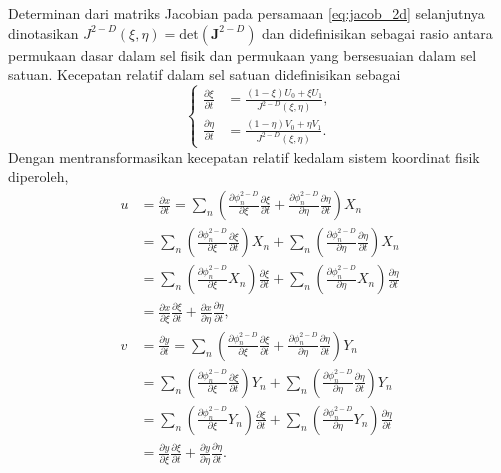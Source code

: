 \begin{spacing}{1.5}
	Determinan dari matriks Jacobian pada persamaan \ref{eq:jacob_2d} selanjutnya dinotasikan $J^{2-D}(\xi,\eta)=\text{det}(\textbf{J}^{2-D})$ dan didefinisikan sebagai rasio antara permukaan dasar dalam sel fisik dan permukaan yang bersesuaian dalam sel satuan. Kecepatan relatif dalam sel satuan didefinisikan sebagai
	\begin{equation}
		\begin{cases}
			\frac{\partial \xi}{\partial t} &= \frac{(1-\xi)U_0+\xi U_1}{J^{2-D}(\xi,\eta)}, \\
			\frac{\partial \eta}{\partial t} &= \frac{(1-\eta)V_0+\eta V_1}{J^{2-D}(\xi,\eta)}.
		\end{cases}	
	\end{equation}
	Dengan mentransformasikan kecepatan relatif kedalam sistem koordinat fisik diperoleh,
	\begin{equation*}
		\begin{aligned}
			u &= \frac{\partial x}{\partial t} = \sum_n \left(\frac{\partial \phi_n^{2-D}}{\partial \xi}\frac{\partial \xi}{\partial t}+\frac{\partial \phi_n^{2-D}}{\partial \eta}\frac{\partial \eta}{\partial t}\right)X_n \\
			&= \sum_n \left(\frac{\partial \phi_n^{2-D}}{\partial \xi}\frac{\partial \xi}{\partial t}\right)X_n + \sum_n \left(\frac{\partial \phi_n^{2-D}}{\partial \eta}\frac{\partial \eta}{\partial t}\right)X_n \\
			&= \sum_n \left(\frac{\partial \phi_n^{2-D}}{\partial \xi}X_n\right)\frac{\partial \xi}{\partial t} + \sum_n \left(\frac{\partial \phi_n^{2-D}}{\partial \eta}X_n\right)\frac{\partial \eta}{\partial t} \\
			&= \frac{\partial x}{\partial \xi}\frac{\partial \xi}{\partial t}+\frac{\partial x}{\partial \eta}\frac{\partial \eta}{\partial t}, \\
			v &= \frac{\partial y}{\partial t} = \sum_n \left(\frac{\partial \phi_n^{2-D}}{\partial \xi}\frac{\partial \xi}{\partial t}+\frac{\partial \phi_n^{2-D}}{\partial \eta}\frac{\partial \eta}{\partial t}\right)Y_n \\
			&= \sum_n \left(\frac{\partial \phi_n^{2-D}}{\partial \xi}\frac{\partial \xi}{\partial t}\right)Y_n + \sum_n \left(\frac{\partial \phi_n^{2-D}}{\partial \eta}\frac{\partial \eta}{\partial t}\right)Y_n \\
			&= \sum_n \left(\frac{\partial \phi_n^{2-D}}{\partial \xi}Y_n\right)\frac{\partial \xi}{\partial t} + \sum_n \left(\frac{\partial \phi_n^{2-D}}{\partial \eta}Y_n\right)\frac{\partial \eta}{\partial t} \\
			&= \frac{\partial y}{\partial \xi}\frac{\partial \xi}{\partial t}+\frac{\partial y}{\partial \eta}\frac{\partial \eta}{\partial t}.
		\end{aligned}	
	\end{equation*}

\end{spacing}
